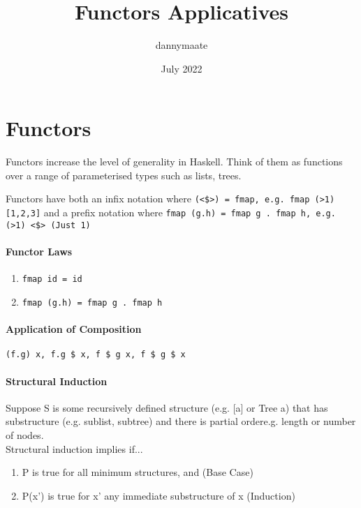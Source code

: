\documentclass{article}
\title{Functors Applicatives}
\author{dannymaate}
\date{July 2022}
\begin{document}
\maketitle

\section{Functors}
Functors increase the level of generality in Haskell. Think of them as functions over a range of parameterised types such as lists, trees. \newline

\noindent Functors have both an \textcolor{Mulberry}{infix notation} where \texttt{\textcolor{Emerald}{(<\$>) = fmap}, e.g. fmap (>1) [1,2,3]} and a \textcolor{Mulberry}{prefix notation} where \texttt{\textcolor{Emerald}{fmap (g.h) = fmap g . fmap h}, e.g. (>1) <\$> (Just 1)}

\paragraph{Functor Laws}
\begin{enumerate}
  \item \texttt{fmap id = id}
  \item \texttt{fmap (g.h) = fmap g . fmap h}
\end{enumerate}

\paragraph{Application of Composition}
\texttt{(f.g) x, f.g \$ x, f \$ g x, f \$ g \$ x}

\paragraph{Structural Induction}
Suppose S is some \textcolor{Mulberry}{recursively defined structure} (e.g. [a] or Tree a) that has \textcolor{Mulberry}{substructure} (e.g. sublist, subtree) and there is \textcolor{Mulberry}{partial order}{e.g. length or number of nodes}. 
\\
\textcolor{Mulberry}{Structural induction} implies if...
\begin{enumerate}
  \item P is true for \textcolor{Mulberry}{all minimum structures}, and     (Base Case)
  \item P(x') is true for x' any \textcolor{Mulberry}{immediate substructure} of x (Induction)
\end{enumerate}
\end{document}
